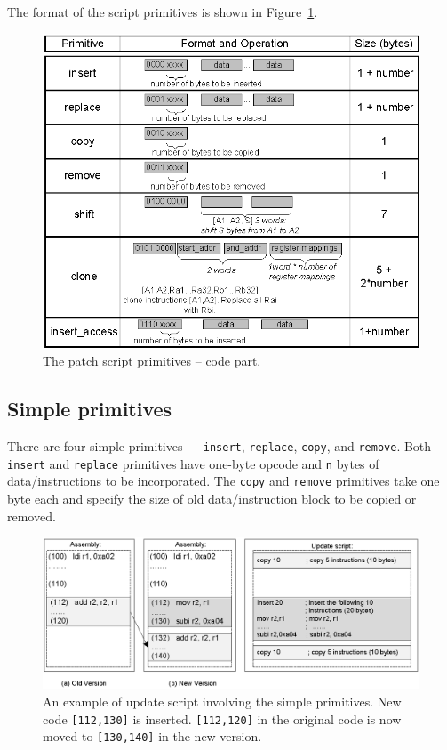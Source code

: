 The format of the script primitives is shown in Figure~\ref{fscript}. 

\begin{figure}[htbp]
\centering
\includegraphics[scale=1.2]{figures/fopcode.eps}
\caption{The patch script primitives -- code part.}
\label{fscript}
\end{figure}


\subsection{Simple primitives}

There are four simple primitives --- {\tt insert}, {\tt replace}, {\tt copy}, and {\tt remove}. Both {\tt insert} and {\tt replace} primitives have one-byte opcode and {\tt n} bytes of data/instructions to be incorporated.  The {\tt copy} and {\tt remove} primitives take one byte each and specify the size of old data/instruction block to be
copied or removed.

\begin{figure}[htbp]
\centering
\includegraphics[width=6in]{figures/sother.eps}
\caption{An example of update script involving the simple primitives. 
New code {\tt [112,130]} is inserted.
{\tt [112,120]} in the original code is now moved to {\tt [130,140]} 
in the new version.
}
\label{fsother}
\end{figure}

